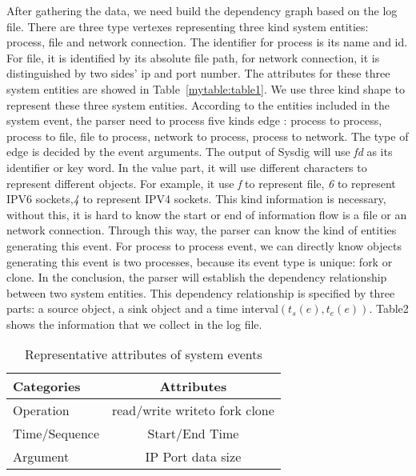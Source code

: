 After gathering the data, we need build the dependency graph based on the log file. There are three type vertexes representing three kind system entities: process, file and network connection.
The identifier for process is its name and id.  For file, it is identified by its absolute file path, for network connection, it is distinguished by two sides' ip and port number. The attributes for these three system entities are showed in Table~\ref{mytable:table1}. We use three kind shape to represent these three system entities. According to the entities included in the system event, the parser need to process five kinds edge : process to process, process to file, file to process, network to process, process to network. The type of edge is decided by the event arguments. The output of Sysdig will use \textit{fd} as its identifier or key word. In the value part, it will use different characters to represent different objects. For example, it use \textit{f} to represent file, \textit{6} to represent IPV6 sockets,\textit{4} to represent IPV4 sockets. This kind information is necessary, without this, it is hard to know the start or end of information flow is a file or an network connection.  Through this way, the parser can know the kind of entities generating this event. For process to process event, we can directly know objects generating this event is two processes, because its event type is unique: fork or clone. In the conclusion, the parser will establish the dependency relationship between two system entities. This dependency relationship is specified by three parts: a source object, a sink object and a time interval$(t_s(e), t_e(e))$. Table2 shows the information that we collect in the log file.

\begin{table}[t!p]
	\centering
	\caption{Representation Of System Entities}
	\label{mytable:table1}
\end{table}
\begin{table}[!htp]
	\centering
	\caption{Representative attributes of system events}
	\label{table2}
	\begin{tabular}{|l|c|}
		\hline
		Categories    & Attributes                    \\ \hline
		Operation     & read/write writeto fork clone \\ \hline
		Time/Sequence & Start/End Time                \\ \hline
		Argument      & IP Port data size             \\ \hline
	\end{tabular}
\end{table}




